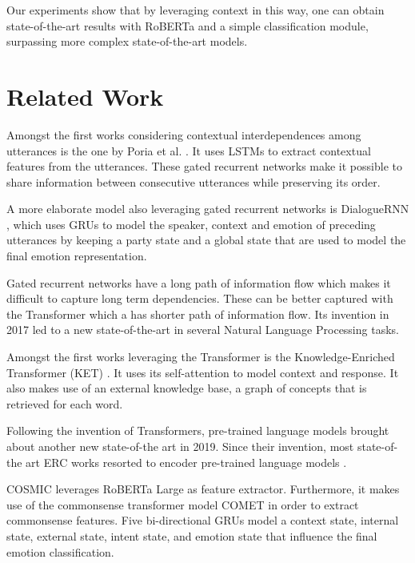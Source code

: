 \documentclass[11pt]{article}
\begin{document}
Our experiments show that by leveraging context in this way,
one can obtain state-of-the-art results with RoBERTa and a simple classification module, surpassing more complex state-of-the-art models.

\section{Related Work}
\label{rl}
Amongst the first works considering contextual interdependences among utterances is the one by Poria et al. \cite{poria-etal-2017-context}. It uses LSTMs to extract contextual features from the utterances. These gated recurrent networks make it possible to share information between consecutive utterances while preserving its order.

A more elaborate model also leveraging gated recurrent networks is DialogueRNN \cite{majumder2019dialoguernn}, which uses GRUs to model the speaker, context and emotion of preceding utterances by keeping a party state and a global state that are used to model the final emotion representation.

Gated recurrent networks have a long path of information flow which makes it difficult to capture long term dependencies. These can be better captured with the Transformer which a has shorter path of information flow. Its invention in 2017 \cite{vaswani2017attention} led to a new state-of-the-art in several Natural Language Processing tasks. 

Amongst the first works leveraging the Transformer is the Knowledge-Enriched Transformer (KET) \cite{zhong-etal-2019-knowledge}. It uses its self-attention to model context and response. 
It also makes use of an external knowledge base, a graph of concepts that is retrieved for each word.


Following the invention of Transformers, pre-trained language models brought about another new state-of-the art in 2019. Since their invention, most state-of-the art ERC works resorted to encoder pre-trained language models \cite{shen2021dialogxl} \cite{ghosal-etal-2020-cosmic} \cite{li-etal-2021-past-present}.

COSMIC \cite{ghosal-etal-2020-cosmic} leverages RoBERTa Large as feature extractor. Furthermore, it makes use of the commonsense transformer model COMET \cite{bosselut2019comet} in order to extract commonsense features. Five bi-directional GRUs model a context state, internal state, external state, intent state, and emotion state that influence the final emotion classification.
\end{document}
